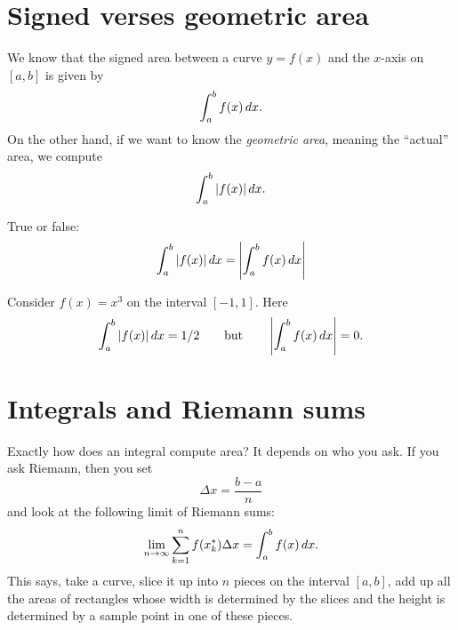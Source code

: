 \documentclass{ximera}
\begin{document}
\section{Signed verses geometric area}


We know that the signed area between a curve $y=f(x)$ and the $x$-axis
on $[a,b]$ is given by
\[
\int_a^b f(x) \mathop{}\!d x.
\]
On the other hand, if we want to know the \textit{geometric area},
meaning the ``actual'' area, we compute
\[
\int_a^b |f(x)| \mathop{}\!d x.
\]
\begin{question}
  True or false:
  \[
  \int_a^b |f(x)| \mathop{}\!d x = \left|\int_a^b f(x) \mathop{}\!d x\right|
  \]
  \begin{multipleChoice}
  \end{multipleChoice}
  \begin{feedback}
    Consider $f(x) = x^3$ on the interval $[-1,1]$. Here
    \[
    \int_a^b |f(x)| \mathop{}\!d x = 1/2 \qquad\text{but}\qquad \left|\int_a^b
    f(x) \mathop{}\!d x\right| = 0.
    \]
  \end{feedback}
\end{question}



\section{Integrals and Riemann sums}

Exactly how does an integral compute area? It depends on who you
ask. If you ask Riemann, then you set
\[
\Delta x = \frac{b-a}{n}
\]
and look at the following limit of Riemann sums:
\[
\lim_{n\to \infty} \sum_{k=1}^n f(x_k^*) \Delta x = \int_a^b f(x) \mathop{}\!d x.
\]
This says, take a curve, slice it up into $n$ pieces on the interval
$[a,b]$, add up all the areas of rectangles whose width is determined
by the slices and the height is determined by a sample point in one of
these pieces.
\end{document}
